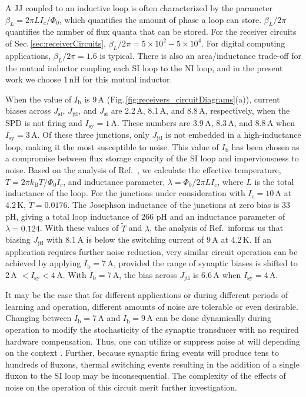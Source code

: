 \documentclass[twocolumn]{article}
\newcommand{\onlinecite}[1]{\hspace{-1 ex} \nocite{#1}\citenum{#1}}
\begin{document}
A JJ coupled to an inductive loop is often characterized by the parameter $\beta_L = 2\pi L I_c/\Phi_0$, which quantifies the amount of phase a loop can store. $\beta_L / 2\pi$ quantifies the number of flux quanta that can be stored. For the receiver circuits of Sec.\,\ref{sec:receiverCircuits}, $\beta_L/2\pi = 5\times10^2 - 5\times10^4$. For digital computing applications, $\beta_L/2\pi = 1.6$ is typical. There is also an area/inductance trade-off for the mutual inductor coupling each SI loop to the NI loop, and in the present work we choose 1\,nH for this mutual inductor.

When the value of $I_{\mathrm{b}}$ is 9\,\textmu A (Fig.\,\ref{fig:receivers_circuitDiagrams}(a)), current biases across $J_{\mathrm{sf}}$, $J_{\mathrm{jtl}}$, and $J_{\mathrm{si}}$ are 2.2\,\textmu A, 8.1\,\textmu A, and 8.8\,\textmu A, respectively, when the SPD is not firing and $I_{\mathrm{sy}} = 1$\,\textmu A. These numbers are 3.9\,\textmu A, 8.3\,\textmu A, and 8.8\,\textmu A when $I_{\mathrm{sy}} = 3$\,\textmu A. Of these three junctions, only $J_{\mathrm{jtl}}$ is not embedded in a high-inductance loop, making it the most susceptible to noise. This value of $I_{\mathrm{b}}$ has been chosen as a compromise between flux storage capacity of the SI loop and imperviousness to noise. Based on the analysis of Ref.\,\onlinecite{sesc2016}, we calculate the effective temperature, $\tilde{T} = 2\pi k_{\mathrm{B}} T/\Phi_0 I_c$, and inductance parameter, $\lambda = \Phi_0/2\pi LI_c$, where $L$ is the total inductance of the loop. For the junctions under consideration with $I_c = 10$\,\textmu A at 4.2\,K, $\tilde{T} = 0.0176$. The Josephson inductance of the junctions at zero bias is 33\,pH, giving a total loop inductance of 266 pH and an inductance parameter of $\lambda = 0.124$. With these values of $\tilde{T}$ and $\lambda$, the analysis of Ref.\,\onlinecite{sesc2016} informs us that biasing $J_{\mathrm{jtl}}$ with 8.1\,\textmu A is below the switching current of 9\,\textmu A at 4.2\,K. If an application requires further noise reduction, very similar circuit operation can be achieved by applying $I_{\mathrm{b}} = 7$\,\textmu A, provided the range of synaptic biases is shifted to 2\,\textmu A $< I_{\mathrm{sy}} < 4$\,\textmu A. With $I_{\mathrm{b}} = 7$\,\textmu A, the bias across $J_{\mathrm{jtl}}$ is 6.6\,\textmu A when $I_{\mathrm{sy}} = 4$\,\textmu A.

It may be the case that for different applications or during different periods of learning and operation, different amounts of noise are tolerable or even desirable. Changing between $I_{\mathrm{b}} = 7$\,\textmu A and $I_{\mathrm{b}} = 9$\,\textmu A can be done dynamically during operation to modify the stochasticity of the synaptic transducer with no required hardware compensation. Thus, one can utilize or suppress noise at will depending on the context \cite{vrso1996,vora2005,stgo2005}. Further, because synaptic firing events will produce tens to hundreds of fluxons, thermal switching events resulting in the addition of a single fluxon to the SI loop may be inconsequential. The complexity of the effects of noise on the operation of this circuit merit further investigation.
\end{document}
